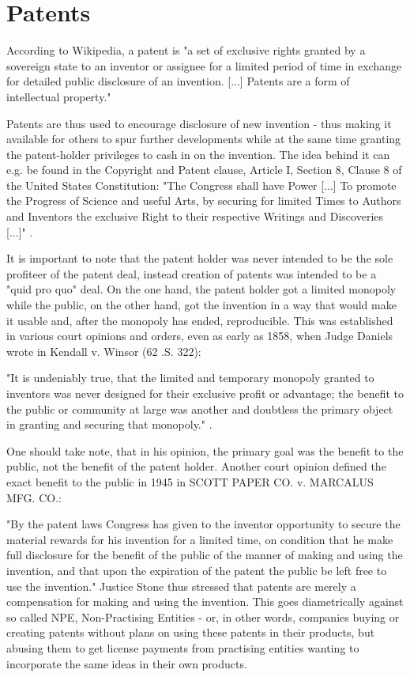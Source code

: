 \documentclass[a4paper]{report}
\begin{document}
\section{Patents}
\label{sec:Patents}
According to Wikipedia, a patent is "a set of exclusive rights granted by a sovereign state to an inventor or assignee for a limited period of time in exchange for detailed public disclosure of an invention. [...]  Patents are a form of intellectual property." \parencite{WikiPatent2017}

Patents are thus used to encourage disclosure of new invention - thus making it available for others to spur further developments while at the same time granting the patent-holder privileges to cash in on the invention. The idea behind it can e.g. be found in the Copyright and Patent clause, Article I, Section 8, Clause 8 of the United States Constitution: "The Congress shall have Power [...] To promote the Progress of Science and useful Arts, by securing for limited Times to Authors and Inventors the exclusive Right to their respective Writings and Discoveries [...]" \parencite{Washington1787}.

It is important to note that the patent holder was never intended to be the sole profiteer of the patent deal, instead creation of patents was intended to be a "quid pro quo" deal. On the one hand, the patent holder got a limited monopoly while the public, on the other hand, got the invention in a way that would make it usable and, after the monopoly has ended, reproducible. This was established in various court opinions and orders, even as early as 1858, when Judge Daniels wrote in Kendall v. Winsor (62 .S. 322): 

"It is undeniably true, that the limited and temporary monopoly granted to inventors was never designed for their exclusive profit or advantage; the benefit to the public or community at large was another and doubtless the primary object in granting and securing that monopoly." \parencite{Curtis1858}.

One should take note, that in his opinion, the primary goal was the benefit to the public, not the benefit of the patent holder. Another court opinion defined the exact benefit to the public in 1945 in SCOTT PAPER CO. v. MARCALUS MFG. CO.:

"By the patent laws Congress has given to the inventor opportunity to secure the material rewards for his invention for a limited time, on condition that he make full disclosure for the benefit of the public of the manner of making and using the invention, and that upon the expiration of the patent the public be left free to use the invention." \parencite{Stone1945} Justice Stone thus stressed that patents are merely a compensation for making and using the invention. This goes diametrically against so called NPE, Non-Practising Entities - or, in other words, companies buying or creating patents without plans on using these patents in their products, but abusing them to get license payments from practising entities wanting to incorporate the same ideas in their own products.
\end{document}
